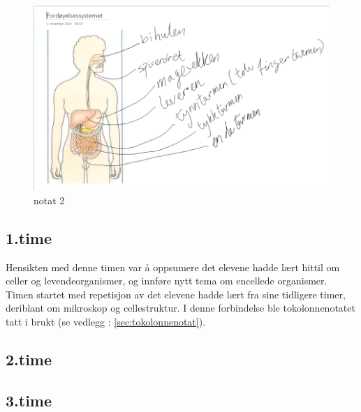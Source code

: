 \documentclass[main.tex]{subfiles}
\begin{document}
\begin{figure}[h!]
\includegraphics[scale = 0.6]{../figures/onenote_fordoyelse.png}
\caption{notat 2}
\label{fig:notat2}
\end{figure}

\subsection*{1.time}

Hensikten med denne timen var å oppsumere det elevene hadde lært hittil om celler og levendeorganismer, og
innføre nytt tema om encellede organismer. Timen startet med repetisjon av det elevene hadde lært fra sine
tidligere timer, deriblant om mikroskop og cellestruktur. 
I denne forbindelse ble tokolonnenotatet tatt i brukt (se vedlegg : \ref{sec:tokolonnenotat}). 

\subsection*{2.time}


\subsection*{3.time}
\end{document}
